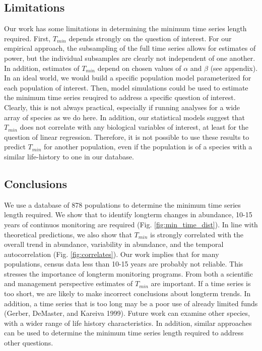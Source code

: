\documentclass[12pt,]{article}
\begin{document}
\subsection{Limitations}\label{limitations}

Our work has some limitations in determining the minimum time series
length required. First, \(T_{min}\) depends strongly on the question of
interest. For our empirical approach, the subsampling of the full time
series allows for estimates of power, but the individual subsamples are
clearly not independent of one another. In addition, estimates of
\(T_{min}\) depend on chosen values of \(\alpha\) and \(\beta\) (see
appendix). In an ideal world, we would build a specific population model
parameterized for each population of interest. Then, model simulations
could be used to estimate the minimum time series reuqired to address a
specific question of interest. Clearly, this is not always practical,
especially if running analyses for a wide array of species as we do
here. In addition, our statistical models suggest that \(T_{min}\) does
not correlate with any biological variables of interest, at least for
the question of linear regression. Therefore, it is not possible to use
these results to predict \(T_{min}\) for another population, even if the
population is of a species with a similar life-history to one in our
database.

\subsection{Conclusions}\label{conclusions}

We use a database of 878 populations to determine the minimum time
series length required. We show that to identify longterm changes in
abundance, 10-15 years of continuos monitoring are required (Fig.
\ref{fig:min_time_dist}). In line with theoretical predictions, we also
show that \(T_{min}\) is strongly correlated with the overall trend in
abundance, variability in abundance, and the temporal autocorrelation
(Fig. \ref{fig:correlates}). Our work implies that for many populations,
census data less than 10-15 years are probably not reliable. This
stresses the importance of longterm monitoring programs. From both a
scientific and management perspective estimates of \(T_{min}\) are
important. If a time series is too short, we are likely to make
incorrect conclusions about longterm trends. In addition, a time series
that is too long may be a poor use of already limited funds (Gerber,
DeMaster, and Kareiva 1999). Future work can examine other species, with
a wider range of life history characteristics. In addition, similar
approaches can be used to determine the minimum time series length
required to address other questions.
\end{document}

